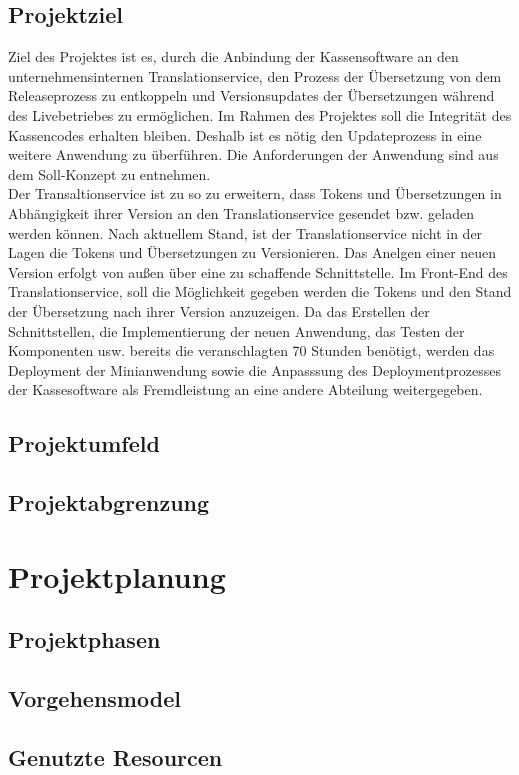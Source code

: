 \documentclass[oneside]{article}
\begin{document}
  \subsection{Projektziel}
    Ziel des Projektes ist es, durch die Anbindung der Kassensoftware an den unternehmensinternen Translationservice,
    den Prozess der Übersetzung von dem Releaseprozess zu entkoppeln und Versionsupdates der Übersetzungen während des Livebetriebes zu ermöglichen.
    Im Rahmen des Projektes soll die Integrität des Kassencodes erhalten bleiben. Deshalb ist es nötig den Updateprozess in eine weitere Anwendung zu überführen. 
    Die Anforderungen der Anwendung sind aus dem Soll-Konzept zu entnehmen.\\
    Der Transaltionservice ist zu so zu erweitern, dass Tokens und Übersetzungen in Abhängigkeit ihrer Version an den Translationservice gesendet bzw. geladen werden können.
    Nach aktuellem Stand, ist der Translationservice nicht in der Lagen die Tokens und Übersetzungen zu Versionieren. Das Anelgen einer neuen Version erfolgt von außen über eine zu schaffende Schnittstelle.
    Im Front-End des Translationservice, soll die Möglichkeit gegeben werden die Tokens und den Stand der Übersetzung nach ihrer Version anzuzeigen.
    Da das Erstellen der Schnittstellen, die Implementierung der neuen Anwendung, das Testen der Komponenten usw. bereits die veranschlagten 70 Stunden benötigt,
    werden das Deployment der Minianwendung sowie die Anpasssung des Deploymentprozesses der Kassesoftware als Fremdleistung an eine andere Abteilung weitergegeben. 
  \subsection{Projektumfeld}
  \subsection{Projektabgrenzung}
  \section{Projektplanung}
  \subsection{Projektphasen}
  \subsection{Vorgehensmodel}
  \subsection{Genutzte Resourcen}
\end{document}
